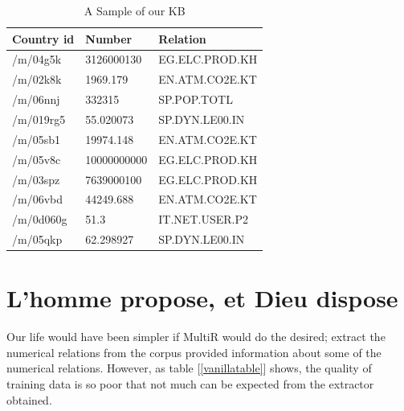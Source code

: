\documentclass[a4paper,10pt]{article}
\begin{document}
\begin{table}[H]
\centering
\begin{tabular}{|l|l|l|}
\hline
Country id & Number & Relation \\
\hline
/m/04g5k&3126000130&EG.ELC.PROD.KH\\
/m/02k8k&1969.179&EN.ATM.CO2E.KT\\
/m/06nnj&332315&SP.POP.TOTL\\
/m/019rg5&55.020073&SP.DYN.LE00.IN\\
/m/05sb1&19974.148&EN.ATM.CO2E.KT\\
/m/05v8c&10000000000&EG.ELC.PROD.KH\\
/m/03spz&7639000100&EG.ELC.PROD.KH\\
/m/06vbd&44249.688&EN.ATM.CO2E.KT\\
/m/0d060g&51.3&IT.NET.USER.P2\\
/m/05qkp&62.298927&SP.DYN.LE00.IN\\
\hline
\end{tabular}
\caption{A Sample of our KB}
\label{fig:kb}
\end{table}


\section{L'homme propose, et Dieu dispose}
Our life would have been simpler if MultiR would do the desired; extract the numerical relations from the corpus provided
information about some of the numerical relations. However, as table [\ref{vanillatable}] shows, the quality of training data
is so poor that not much can be expected from the extractor obtained.

\begin{center}
\begin{table}[H]

\caption{Vanilla Match}
\label{vanillatable}
\end{table}
\end{center}
\end{document}
